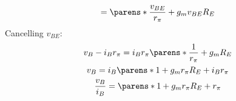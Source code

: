 \begin{multicols}{2}
\begin{CheatsheetEntryFrame}
\begin{gather*}
            = \parens*{
                \frac{v_{BE}}{r_\pi}
                + g_m v_{BE}
            } R_E
        \end{gather*}
        Cancelling $v_{BE}$:
        \begin{gather*}
            v_B - i_B r_\pi
            = i_B r_\pi \parens*{
                \frac{1}{r_\pi}
                + g_m
            } R_E
            \\
            v_B
            = i_B \parens*{
                1
                + g_m r_\pi
            } R_E + i_B r_\pi
            \\
            \frac{v_B}{i_B}
            = \parens*{
                1
                + g_m r_\pi
            } R_E + r_\pi
        \end{gather*}

    \end{CheatsheetEntryFrame}
    

\end{multicols}
